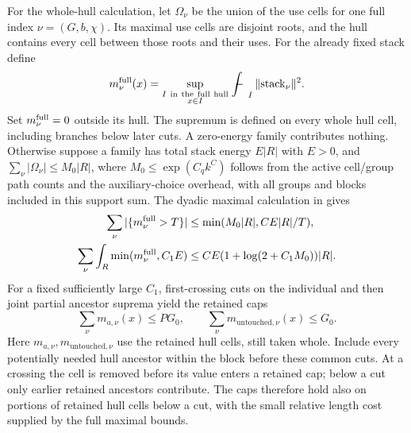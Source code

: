 For the whole-hull calculation, let \(\Omega_\nu\) be the union
of the use cells for one full index \(\nu=(G,b,\chi)\).  Its
maximal use cells are disjoint roots, and the hull contains every cell
between those roots and their uses.  For the already fixed stack
define
\[
 m_\nu^{\rm full}(x)=
 \sup_{\substack{I\ {\rm in\ the\ full\ hull}\\x\in I}}
       \fint_I\|\mathrm{stack}_\nu\|^2.
\]
Set \(m_\nu^{\rm full}=0\) outside its hull.  The supremum is
defined on every whole hull cell, including branches below later cuts.
A zero-energy family contributes
nothing.  Otherwise suppose a family has total stack energy
\(E|R|\) with \(E>0\), and
\(\sum_\nu|\Omega_\nu|\le M_0|R|\), where
\(M_0\le\exp(C_qk^C)\) follows from the active cell/group path
counts and the auxiliary-choice overhead, with all groups and
blocks included in this support sum.  The dyadic maximal calculation
in
\cite[Section~7]{H} gives
\[
 \begin{aligned}
 \sum_\nu|\{m_\nu^{\rm full}>T\}|
 &\le\min(M_0|R|,CE|R|/T),\\
 \sum_\nu\int_R\min(m_\nu^{\rm full},C_1E)
 &\le CE(1+\log(2+C_1M_0))|R|.
 \end{aligned}
\]
For a fixed sufficiently large \(C_1\), first-crossing cuts on the
individual and then joint partial ancestor suprema yield the retained caps
\[
 \sum_\nu m_{a,\nu}(x)\le PG_0,\qquad
 \sum_\nu m_{\mathrm{untouched},\nu}(x)\le G_0.
\]
Here \(m_{a,\nu},m_{\mathrm{untouched},\nu}\) use the retained hull cells, still
taken whole.  Include every potentially needed hull ancestor
within the block before these common cuts.  At a crossing the
cell is removed before its value enters a retained cap; below a
cut only earlier retained ancestors contribute.  The caps
therefore hold also on portions of retained hull cells below a
cut, with the small relative length cost supplied by the full
maximal bounds.


